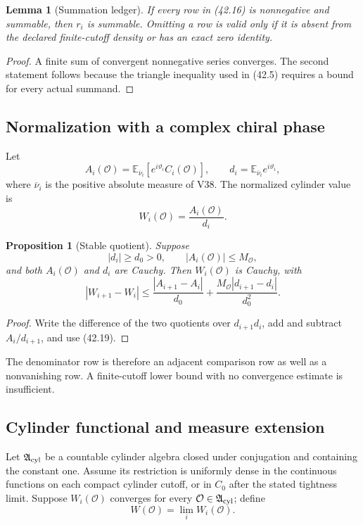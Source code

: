 \documentclass[11pt]{article}
\newtheorem{lemma}[theorem]{Lemma}
\newtheorem{proposition}[theorem]{Proposition}
\begin{document}
\begin{lemma}[Summation ledger]
\label{lem:v11v42-ledger}
If every row in (42.16) is nonnegative and summable, then \(r_i\) is
summable.  Omitting a row is valid only if it is absent from the
declared finite-cutoff density or has an exact zero identity.
\end{lemma}

\begin{proof}
A finite sum of convergent nonnegative series converges.  The second
statement follows because the triangle inequality used in (42.5)
requires a bound for every actual summand.
\end{proof}

\subsection{Normalization with a complex chiral phase}

Let
\[
 A_i(\mathcal O)
 =
 \mathbb E_{\overline\nu_i}
 [e^{i\vartheta_i}C_i(\mathcal O)],
 \qquad
 d_i=
 \mathbb E_{\overline\nu_i}e^{i\vartheta_i},
 \tag{42.17}
\]
where \(\overline\nu_i\) is the positive absolute measure of V38.
The normalized cylinder value is
\[
 W_i(\mathcal O)=\frac{A_i(\mathcal O)}{d_i}.
 \tag{42.18}
\]

\begin{proposition}[Stable quotient]
\label{prop:v11v42-quotient}
Suppose
\[
 |d_i|\geq d_0>0,\qquad |A_i(\mathcal O)|\leq M_{\mathcal O},
 \tag{42.19}
\]
and both \(A_i(\mathcal O)\) and \(d_i\) are Cauchy.  Then
\(W_i(\mathcal O)\) is Cauchy, with
\[
 |W_{i+1}-W_i|
 \leq
 \frac{|A_{i+1}-A_i|}{d_0}
 +\frac{M_{\mathcal O}|d_{i+1}-d_i|}{d_0^2}.
 \tag{42.20}
\]
\end{proposition}

\begin{proof}
Write the difference of the two quotients over
\(d_{i+1}d_i\), add and subtract \(A_i/d_{i+1}\), and use (42.19).
\end{proof}

The denominator row is therefore an adjacent comparison row as well as
a nonvanishing row.  A finite-cutoff lower bound with no convergence
estimate is insufficient.

\subsection{Cylinder functional and measure extension}

Let \(\mathfrak A_{\rm cyl}\) be a countable cylinder algebra closed
under conjugation and containing the constant one.  Assume its restriction is
uniformly dense in the continuous functions on each compact cylinder cutoff,
or in \(C_0\) after the stated tightness limit.  Suppose
\(W_i(\mathcal O)\) converges for every
\(\mathcal O\in\mathfrak A_{\rm cyl}\); define
\[
 W(\mathcal O)=\lim_iW_i(\mathcal O).
 \tag{42.21}
\]
\end{document}
